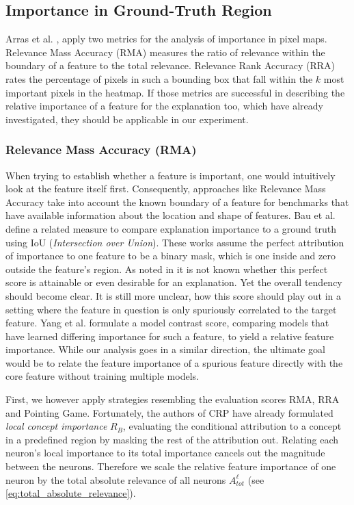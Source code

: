 \subsection{Importance in Ground-Truth Region}\label{section:region_specific}
Arras et al. \cite{Arras2022}, apply two metrics for the analysis of importance in pixel maps. Relevance Mass Accuracy (RMA) measures the ratio of relevance within the boundary of a feature to the total relevance. Relevance Rank Accuracy (RRA) rates the percentage of pixels in such a bounding box that fall within the $k$ most important pixels in the heatmap. If those metrics are successful in describing the relative importance of a feature for the explanation too, which \cite{Yang2019} have already investigated, they should be applicable in our experiment. 

\subsubsection{Relevance Mass Accuracy (RMA)}
When trying to establish whether a feature is important, one would intuitively look at the feature itself first. Consequently, approaches like Relevance Mass Accuracy take into account the known boundary of a feature for benchmarks that have available information about the location and shape of features.
Bau et al. \cite{Bau2017, Bau2020} define a related measure to compare explanation importance to a ground truth using IoU (\textit{Intersection over Union}). These works assume the perfect attribution of importance to one feature to be a binary mask, which is one inside and zero outside the feature's region.
As noted in \cite{Arras2022} it is not known whether this perfect score is attainable or even desirable for an explanation. Yet the overall tendency should become clear. It is still more unclear, how this score should play out in a setting where the feature in question is only spuriously correlated to the target feature. Yang et al. \cite{Yang2019} formulate a model contrast score, comparing models that have learned differing importance for such a feature, to yield a relative feature importance. While our analysis goes in a similar direction, the ultimate goal would be to relate the feature importance of a spurious feature directly with the core feature without training multiple models.

First, we however apply strategies resembling the evaluation scores RMA, RRA and Pointing Game. 
Fortunately, the authors of CRP have already formulated \textit{local concept importance} $R_B$, evaluating the conditional attribution to a concept in a predefined region by masking the rest of the attribution out. Relating each neuron's local importance to its total importance cancels out the magnitude between the neurons. Therefore we scale the relative feature importance of one neuron by the total absolute relevance of all neurons $A_{tot}^{\ell}$ (see \cref{eq:total_absolute_relevance}).

